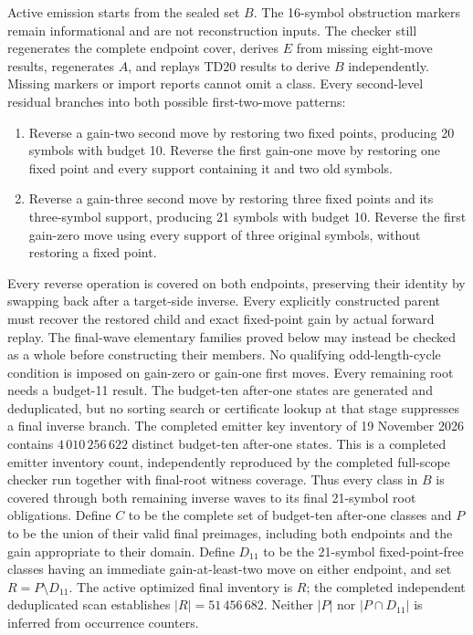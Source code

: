 \documentclass[11pt,a4paper]{article}
\begin{document}
Active emission starts from the sealed set $B$. The 16-symbol obstruction
markers remain informational and are not reconstruction inputs. The checker
still regenerates the complete endpoint cover, derives $E$ from missing
eight-move results, regenerates $A$, and replays TD20 results to derive $B$
independently. Missing markers or import reports cannot omit a class.
Every second-level residual branches into both possible first-two-move patterns:
\begin{enumerate}
\item Reverse a gain-two second move by restoring two fixed points, producing
20 symbols with budget 10. Reverse the first gain-one move by
restoring one fixed point and every support containing it and two old symbols.
\item Reverse a gain-three second move by restoring three fixed points and its
three-symbol support, producing 21 symbols with budget 10. Reverse
the first gain-zero move using every support of three original symbols, without
restoring a fixed point.
\end{enumerate}
Every reverse operation is covered on both endpoints, preserving their
identity by swapping back after a target-side inverse. Every explicitly
constructed parent must recover the restored child and exact fixed-point gain
by actual forward replay. The final-wave elementary families proved below
may instead be checked as a whole before constructing their members. No
qualifying odd-length-cycle condition is imposed on gain-zero or gain-one
first moves. Every remaining root needs a budget-11 result.
The budget-ten after-one states are generated and deduplicated, but no sorting
search or certificate lookup at that stage suppresses a final inverse branch.
The completed emitter key inventory of 19 November 2026 contains
$4\,010\,256\,622$ distinct budget-ten after-one states. This is a completed
emitter inventory count, independently reproduced by the completed full-scope
checker run together with final-root witness coverage.
Thus every class in $B$ is covered through both remaining inverse waves to
its final 21-symbol root obligations. Define $C$ to be the complete set of
budget-ten after-one classes and $P$ to be the union of their valid final
preimages, including both endpoints and the gain appropriate to their domain.
Define $D_{11}$ to be the 21-symbol fixed-point-free classes having an
immediate gain-at-least-two move on either endpoint, and set
$R=P\setminus D_{11}$. The active optimized final inventory is $R$; the
completed independent deduplicated scan establishes $|R|=51\,456\,682$.
Neither $|P|$ nor $|P\cap D_{11}|$ is inferred from occurrence counters.
\end{document}
